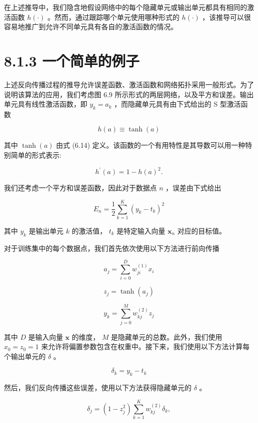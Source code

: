 \documentclass[10pt]{article}
\begin{document}
在上述推导中，我们隐含地假设网络中的每个隐藏单元或输出单元都具有相同的激活函数 \(h\left( \cdot \right)\) 。然而，通过跟踪哪个单元使用哪种形式的 \(h\left( \cdot \right)\) ，该推导可以很容易地推广到允许不同单元具有各自的激活函数的情况。

\section*{8.1.3 一个简单的例子}

上述反向传播过程的推导允许误差函数、激活函数和网络拓扑采用一般形式。为了说明该算法的应用，我们考虑图 6.9 所示形式的两层网络，以及平方和误差。输出单元具有线性激活函数，即 \({y}_{k} = {a}_{k}\) ，而隐藏单元具有由下式给出的 S 型激活函数

\[
h\left( a\right)  \equiv  \tanh \left( a\right)  \tag{8.15}
\]

其中 \(\tanh \left( a\right)\) 由式 (6.14) 定义。该函数的一个有用特性是其导数可以用一种特别简单的形式表示:

\[
{h}^{\prime }\left( a\right)  = 1 - h{\left( a\right) }^{2}. \tag{8.16}
\]

我们还考虑一个平方和误差函数，因此对于数据点 \(n\) ，误差由下式给出

\[
{E}_{n} = \frac{1}{2}\mathop{\sum }\limits_{{k = 1}}^{K}{\left( {y}_{k} - {t}_{k}\right) }^{2} \tag{8.17}
\]

其中 \({y}_{k}\) 是输出单元 \(k\) 的激活值， \({t}_{k}\) 是特定输入向量 \({\mathbf{x}}_{n}\) 对应的目标值。

对于训练集中的每个数据点，我们首先依次使用以下方法进行前向传播

\[
{a}_{j} = \mathop{\sum }\limits_{{i = 0}}^{D}{w}_{ji}^{\left( 1\right) }{x}_{i} \tag{8.18}
\]

\[
{z}_{j} = \tanh \left( {a}_{j}\right)  \tag{8.19}
\]

\[
{y}_{k} = \mathop{\sum }\limits_{{j = 0}}^{M}{w}_{kj}^{\left( 2\right) }{z}_{j} \tag{8.20}
\]

其中 \(D\) 是输入向量 \(\mathbf{x}\) 的维度， \(M\) 是隐藏单元的总数。此外，我们使用 \({x}_{0} = {z}_{0} = 1\) 来允许将偏置参数包含在权重中。接下来，我们使用以下方法计算每个输出单元的 \(\delta\) 。

\[
{\delta }_{k} = {y}_{k} - {t}_{k} \tag{8.21}
\]

然后，我们反向传播这些误差，使用以下方法获得隐藏单元的 \(\delta\) 。

\[
{\delta }_{j} = \left( {1 - {z}_{j}^{2}}\right) \mathop{\sum }\limits_{{k = 1}}^{K}{w}_{kj}^{\left( 2\right) }{\delta }_{k}, \tag{8.22}
\]
\end{document}
